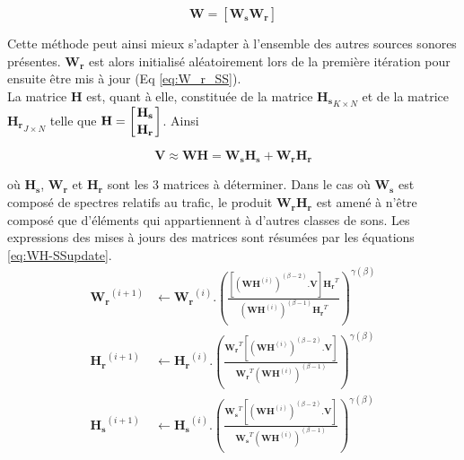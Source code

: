 \begin{equation}
\mathbf{W} = \left[ \mathbf{W_s} \mathbf{W_r} \right]
\end{equation}

Cette méthode peut ainsi mieux s'adapter à l'ensemble des autres sources sonores présentes. $\mathbf{W_r}$ est alors initialisé aléatoirement lors de la première itération pour ensuite être mis à jour (Eq \ref{eq:W_r_SS}).\\

La matrice $\mathbf{H}$ est, quant à elle, constituée de la matrice $\mathbf{H_s}_{K \times N}$ et de la matrice $\mathbf{H_r}_{J \times N}$ telle que $\mathbf{H} = \left[ \genfrac{}{}{0pt}{0}{\mathbf{H_s}}{\mathbf{H_r}} \right]$.  Ainsi 

\begin{equation}
\mathbf{V} \approx \mathbf{WH} = \mathbf{W_s} \mathbf{H_s} + \mathbf{W_r} \mathbf{H_r}
\end{equation}

où $\mathbf{H_s}$, $\mathbf{W_r}$ et $\mathbf{H_r}$ sont les 3 matrices à déterminer. Dans le cas où $\mathbf{W_s}$ est composé de spectres relatifs au trafic, le produit $\mathbf{W_r} \mathbf{H_r}$ est amené à n'être composé que d'éléments qui appartiennent à d'autres classes de sons. Les expressions des mises à jours des matrices sont résumées par les équations \ref{eq:WH-SSupdate}. \\ 

\begin{subequations}\label{eq:WH-SSupdate}
\begin{align}
\mathbf{W_r}^{(i+1)} &\leftarrow \mathbf{W_r}^{(i)}.\left(\frac{\left[\left(\mathbf{WH}^{(i)} \right)^{(\beta-2)}.\mathbf{V} \right]\mathbf{H_r}^T}{\left(\mathbf{WH}^{(i)} \right)^{(\beta-1)}\mathbf{H_r}^T}\right)^{\gamma(\beta)}\label{eq:W_r_SS}\\
\mathbf{H_r}^{(i+1)} &\leftarrow \mathbf{H_r}^{(i)}.\left(\frac{\mathbf{W_r}^T \left[\left(\mathbf{WH}^{(i)} \right)^{(\beta-2)}.\mathbf{V} \right]}{\mathbf{W_r}^T \left(\mathbf{WH}^{(i)} \right)^{(\beta-1)}}\right)^{\gamma(\beta)}\label{eq:H_r_SS}\\
\mathbf{H_s}^{(i+1)} &\leftarrow \mathbf{H_s}^{(i)}.\left(\frac{\mathbf{W_s}^T \left[\left(\mathbf{WH}^{(i)} \right)^{(\beta-2)}.\mathbf{V} \right]}{\mathbf{W_s}^T \left(\mathbf{WH}^{(i)} \right)^{(\beta-1)}}\right)^{\gamma(\beta)}\label{eq:H_s_SS}
\end{align}
\end{subequations}

